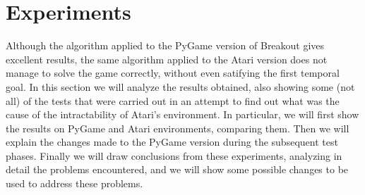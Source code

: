 \section{Experiments}
\label{subsec:experiments}

Although the algorithm applied to the PyGame version of Breakout gives
excellent results, the same algorithm applied to the Atari version does not
manage to solve the game correctly, without even satifying the first
temporal goal.
In this section we will analyze the results obtained, also showing some (not all) of the tests that were carried out in an attempt to find out what was the cause of the intractability of Atari's environment. In particular, we will first show the results on PyGame and Atari environments, comparing them. Then we will explain the changes made to the PyGame version during the subsequent test phases. Finally we will draw conclusions from these experiments, analyzing in detail the problems encountered, and we will show some possible changes to be used to address these problems.

